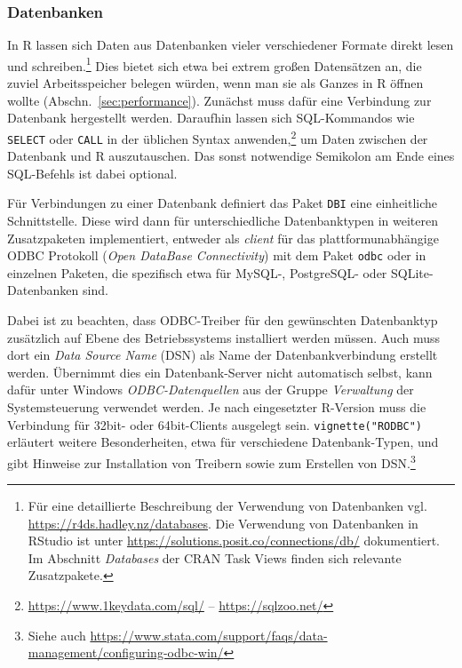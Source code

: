 \subsubsection{Datenbanken}

In R lassen sich Daten aus Datenbanken vieler verschiedener Formate direkt lesen und schreiben.\footnote{Für eine detaillierte Beschreibung der Verwendung von Datenbanken vgl.\  \url{https://r4ds.hadley.nz/databases}. Die Verwendung von Datenbanken in RStudio ist unter \url{https://solutions.posit.co/connections/db/} dokumentiert. Im Abschnitt \emph{Databases} der CRAN Task Views \cite{CRANtvDatabase} finden sich relevante Zusatzpakete.} Dies bietet sich etwa bei extrem großen Datensätzen an, die zuviel Arbeitsspeicher belegen würden, wenn man sie als Ganzes in R öffnen wollte (Abschn.\ \ref{sec:performance}). Zunächst muss dafür eine Verbindung zur Datenbank hergestellt werden. Daraufhin lassen sich SQL-Kommandos wie \lstinline!SELECT! oder \lstinline!CALL! in der üblichen Syntax anwenden,\footnote{\url{https://www.1keydata.com/sql/} -- \url{https://sqlzoo.net/}} um Daten zwischen der Datenbank und R auszutauschen. Das sonst notwendige Semikolon am Ende eines SQL-Befehls ist dabei optional.

Für Verbindungen zu einer Datenbank definiert das Paket \lstinline!DBI! \cite{RSIGDB2014} eine einheitliche Schnittstelle. Diese wird dann für unterschiedliche Datenbanktypen in weiteren Zusatzpaketen implementiert, entweder als \emph{client} für das plattformunabhängige ODBC Protokoll (\emph{Open DataBase Connectivity}) mit dem Paket \lstinline!odbc! \cite{Hester2018} oder in einzelnen Paketen, die spezifisch etwa für MySQL-, PostgreSQL- oder SQLite-Datenbanken sind.

Dabei ist zu beachten, dass ODBC-Treiber für den gewünschten Datenbanktyp zusätzlich auf Ebene des Betriebssystems installiert werden müssen. Auch muss dort ein \emph{Data Source Name} (DSN) als Name der Datenbankverbindung erstellt werden. Übernimmt dies ein Datenbank-Server nicht automatisch selbst, kann dafür unter Windows \emph{ODBC-Datenquellen} aus der Gruppe \emph{Verwaltung} der Systemsteuerung verwendet werden. Je nach eingesetzter R-Version muss die Verbindung für 32bit- oder 64bit-Clients ausgelegt sein. \lstinline!vignette("RODBC")! erläutert weitere Besonderheiten, etwa für verschiedene Datenbank-Typen, und gibt Hinweise zur Installation von Treibern sowie zum Erstellen von DSN.\footnote{Siehe auch \url{https://www.stata.com/support/faqs/data-management/configuring-odbc-win/}}

